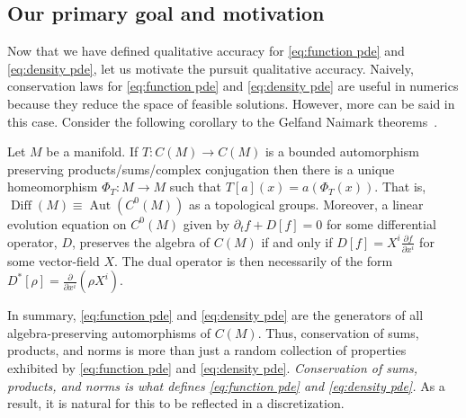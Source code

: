 \documentclass[final,leqno]{siamart}
\newcommand{\pder}[2]{\ensuremath{\frac{ \partial #1}{\partial #2}}}
\DeclareMathOperator{\Diff}{Diff}
\begin{document}
\subsection{Our primary goal and motivation}
Now that we have defined qualitative accuracy for \eqref{eq:function pde} and \eqref{eq:density pde}, let us motivate the pursuit qualitative accuracy.
Naively, conservation laws for \eqref{eq:function pde} and \eqref{eq:density pde} are useful in numerics because they reduce the space of feasible solutions.
However, more can be said in this case.
Consider the following corollary to the Gelfand Naimark theorems~\cite{GelfandNaimark1943}.


\begin{proposition}
	Let $M$ be a manifold.
	If $T: C(M) \to C(M)$ is a bounded automorphism preserving products/sums/complex conjugation
	then there is a unique homeomorphism $\Phi_{T}:M \to M$ such that $T[a](x) = a( \Phi_{T}(x) )$.
	That is, $\Diff(M) \equiv \operatorname{Aut}( C^{0}(M) )$ as a topological groups.
	Moreover, a linear evolution equation on $C^{0}(M)$ given by $\partial_{t} f + D[f] = 0$ for some differential operator, $D$,
	preserves  the algebra of $C(M)$ if and only if $D[f] = X^{i} \pder{f}{x^{i}}$ for some vector-field $X$.
	The dual operator is then necessarily of the form $D^{*}[\rho] = \pder{}{x^{i}}( \rho X^{i})$.
\end{proposition}

In summary, \eqref{eq:function pde} and \eqref{eq:density pde} are the generators of all algebra-preserving automorphisms of $C(M)$.
Thus, conservation of sums, products, and norms is more than just a random collection of properties exhibited by \eqref{eq:function pde} and \eqref{eq:density pde}.
\emph{Conservation of sums, products, and norms is what defines \eqref{eq:function pde} and \eqref{eq:density pde}.}
As a result, it is natural for this to be reflected in a discretization.
\end{document}
